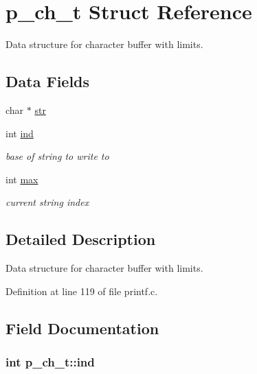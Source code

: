 \hypertarget{structp__ch__t}{}\section{p\+\_\+ch\+\_\+t Struct Reference}
\label{structp__ch__t}


Data structure for character buffer with limits.  


\subsection*{Data Fields}
\begin{DoxyCompactItemize}
\item 
char $\ast$ \hyperlink{structp__ch__t_aa3c8616342a2717bc714bf1b6d00516f}{str}
\item 
int \hyperlink{structp__ch__t_a9d6834d749cd9232a16cb20b598fe90d}{ind}
\begin{DoxyCompactList}\small\item\em base of string to write to \end{DoxyCompactList}\item 
int \hyperlink{structp__ch__t_a0dee9f28e498d427e53051b7e1846d34}{max}
\begin{DoxyCompactList}\small\item\em current string index \end{DoxyCompactList}\end{DoxyCompactItemize}


\subsection{Detailed Description}
Data structure for character buffer with limits. 

Definition at line 119 of file printf.\+c.



\subsection{Field Documentation}
\subsubsection[{\texorpdfstring{ind}{ind}}]{\setlength{\rightskip}{0pt plus 5cm}int p\+\_\+ch\+\_\+t\+::ind}\hypertarget{structp__ch__t_a9d6834d749cd9232a16cb20b598fe90d}{}\label{structp__ch__t_a9d6834d749cd9232a16cb20b598fe90d}


